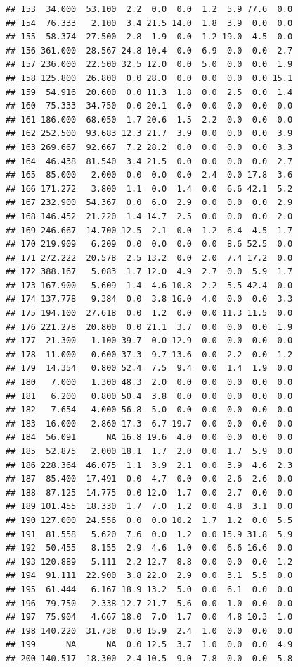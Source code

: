 \documentclass[]{report}
\begin{document}
\begin{verbatim}
## 153  34.000  53.100  2.2  0.0  0.0  1.2  5.9 77.6  0.0
## 154  76.333   2.100  3.4 21.5 14.0  1.8  3.9  0.0  0.0
## 155  58.374  27.500  2.8  1.9  0.0  1.2 19.0  4.5  0.0
## 156 361.000  28.567 24.8 10.4  0.0  6.9  0.0  0.0  2.7
## 157 236.000  22.500 32.5 12.0  0.0  5.0  0.0  0.0  1.9
## 158 125.800  26.800  0.0 28.0  0.0  0.0  0.0  0.0 15.1
## 159  54.916  20.600  0.0 11.3  1.8  0.0  2.5  0.0  1.4
## 160  75.333  34.750  0.0 20.1  0.0  0.0  0.0  0.0  0.0
## 161 186.000  68.050  1.7 20.6  1.5  2.2  0.0  0.0  0.0
## 162 252.500  93.683 12.3 21.7  3.9  0.0  0.0  0.0  3.9
## 163 269.667  92.667  7.2 28.2  0.0  0.0  0.0  0.0  3.3
## 164  46.438  81.540  3.4 21.5  0.0  0.0  0.0  0.0  2.7
## 165  85.000   2.000  0.0  0.0  0.0  2.4  0.0 17.8  3.6
## 166 171.272   3.800  1.1  0.0  1.4  0.0  6.6 42.1  5.2
## 167 232.900  54.367  0.0  6.0  2.9  0.0  0.0  0.0  2.9
## 168 146.452  21.220  1.4 14.7  2.5  0.0  0.0  0.0  2.0
## 169 246.667  14.700 12.5  2.1  0.0  1.2  6.4  4.5  1.7
## 170 219.909   6.209  0.0  0.0  0.0  0.0  8.6 52.5  0.0
## 171 272.222  20.578  2.5 13.2  0.0  2.0  7.4 17.2  0.0
## 172 388.167   5.083  1.7 12.0  4.9  2.7  0.0  5.9  1.7
## 173 167.900   5.609  1.4  4.6 10.8  2.2  5.5 42.4  0.0
## 174 137.778   9.384  0.0  3.8 16.0  4.0  0.0  0.0  3.3
## 175 194.100  27.618  0.0  1.2  0.0  0.0 11.3 11.5  0.0
## 176 221.278  20.800  0.0 21.1  3.7  0.0  0.0  0.0  1.9
## 177  21.300   1.100 39.7  0.0 12.9  0.0  0.0  0.0  0.0
## 178  11.000   0.600 37.3  9.7 13.6  0.0  2.2  0.0  1.2
## 179  14.354   0.800 52.4  7.5  9.4  0.0  1.4  1.9  0.0
## 180   7.000   1.300 48.3  2.0  0.0  0.0  0.0  0.0  0.0
## 181   6.200   0.800 50.4  3.8  0.0  0.0  0.0  0.0  0.0
## 182   7.654   4.000 56.8  5.0  0.0  0.0  0.0  0.0  0.0
## 183  16.000   2.860 17.3  6.7 19.7  0.0  0.0  0.0  0.0
## 184  56.091      NA 16.8 19.6  4.0  0.0  0.0  0.0  0.0
## 185  52.875   2.000 18.1  1.7  2.0  0.0  1.7  5.9  0.0
## 186 228.364  46.075  1.1  3.9  2.1  0.0  3.9  4.6  2.3
## 187  85.400  17.491  0.0  4.7  0.0  0.0  2.6  2.6  0.0
## 188  87.125  14.775  0.0 12.0  1.7  0.0  2.7  0.0  0.0
## 189 101.455  18.330  1.7  7.0  1.2  0.0  4.8  3.1  0.0
## 190 127.000  24.556  0.0  0.0 10.2  1.7  1.2  0.0  5.5
## 191  81.558   5.620  7.6  0.0  1.2  0.0 15.9 31.8  5.9
## 192  50.455   8.155  2.9  4.6  1.0  0.0  6.6 16.6  0.0
## 193 120.889   5.111  2.2 12.7  8.8  0.0  0.0  0.0  1.2
## 194  91.111  22.900  3.8 22.0  2.9  0.0  3.1  5.5  0.0
## 195  61.444   6.167 18.9 13.2  5.0  0.0  6.1  0.0  0.0
## 196  79.750   2.338 12.7 21.7  5.6  0.0  1.0  0.0  0.0
## 197  75.904   4.667 18.0  7.0  1.7  0.0  4.8 10.3  1.0
## 198 140.220  31.738  0.0 15.9  2.4  1.0  0.0  0.0  0.0
## 199      NA      NA  0.0 12.5  3.7  1.0  0.0  0.0  4.9
## 200 140.517  18.300  2.4 10.5  9.0  7.8  0.0  0.0  5.8
\end{verbatim}
\end{document}
